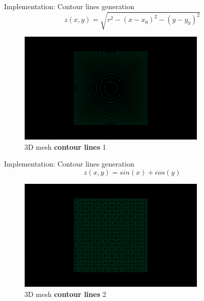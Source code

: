 \documentclass[10pt]{beamer}
\begin{document}
\begin{frame}{Implementation: Contour lines generation}
  \Large
    \[
    z(x, y) = \sqrt{r^2 - (x - x_0)^2 - (y - y_0)^2}
    \]
  \begin{figure}[H]
      \centering
      \includegraphics[width=0.8\textwidth]{images/contour-lambda-1-edges.png}
      \caption{3D mesh \textbf{contour lines} 1}
  \end{figure}
\end{frame}

\begin{frame}{Implementation: Contour lines generation}
  \Large
    \[
    z(x, y) = sin(x) + cos(y)
    \]
  \begin{figure}[H]
      \centering
      \includegraphics[width=0.8\textwidth]{images/contour-lambda-2-edges.png}
      \caption{3D mesh \textbf{contour lines} 2}
  \end{figure}
\end{frame}
\end{document}
